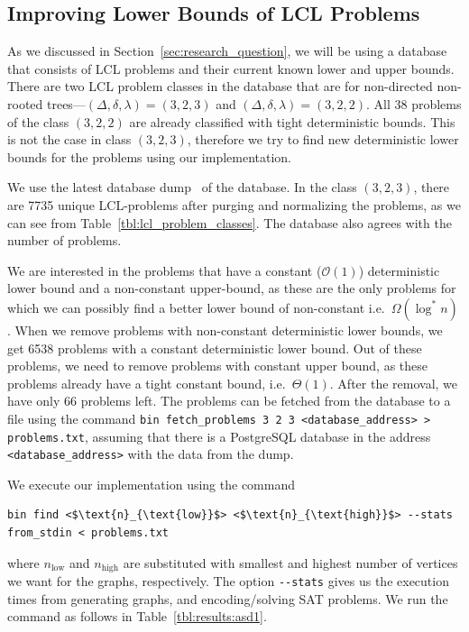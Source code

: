 \subsection{Improving Lower Bounds of LCL Problems}\label{sec:results:improving_bounds}
As we discussed in Section~\ref{sec:research_question}, we will be using a database~\cite{Tereshchenko2021,LclClassifierAalto,LclClassifierGithub} that consists of LCL problems and their current known lower and upper bounds.
There are two LCL problem classes in the database that are for non-directed non-rooted trees---$(\Delta, \delta, \lambda) = (3,2,3)$ and $(\Delta, \delta, \lambda) = (3,2,2)$.
All 38 problems of the class $(3,2,2)$ are already classified with tight deterministic bounds.
This is not the case in class $(3,2,3)$, therefore we try to find new deterministic lower bounds for the problems using our implementation.

We use the latest database dump~\cite{DatabaseDump} of the database.
In the class $(3,2,3)$, there are 7735 unique LCL-problems after purging and normalizing the problems, as we can see from Table~\ref{tbl:lcl_problem_classes}.
The database also agrees with the number of problems.

We are interested in the problems that have a constant ($\mathcal{O}(1)$) deterministic lower bound and a non-constant upper-bound, as these are the only problems for which we can possibly find a better lower bound of non-constant i.e.\ $\Omega(\log^*n)$.
When we remove problems with non-constant deterministic lower bounds, we get 6538 problems with a constant deterministic lower bound.
Out of these problems, we need to remove problems with constant upper bound, as these problems already have a tight constant bound, i.e.\ $\Theta(1)$.
After the removal, we have only 66 problems left.
The problems can be fetched from the database to a file  using the command \verb|bin fetch_problems 3 2 3 <database_address> > problems.txt|, assuming that there is a PostgreSQL database in the address \verb|<database_address>| with the data from the dump.

We execute our implementation using the command
\begin{lstlisting}
bin find <$\text{n}_{\text{low}}$> <$\text{n}_{\text{high}}$> --stats from_stdin < problems.txt
\end{lstlisting}
where $n_\text{low}$ and $n_\text{high}$ are substituted with smallest and highest number of vertices we want for the graphs, respectively.
The option \lstinline{--stats} gives us the execution times from generating graphs, and encoding/solving SAT problems.
We run the command as follows in Table~\ref{tbl:results:asd1}.

